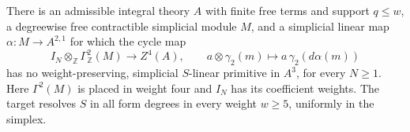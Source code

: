 \begin{proposition}
\label{AL07}
There is an admissible integral theory $A$ with finite free
terms and support $q\leq w$, a degreewise free contractible
simplicial module $M$, and a simplicial linear map
$\alpha:M\to A^{2,1}$ for which the cycle map
\[
 I_N\otimes_{\mathbb Z}\Gamma^2_{\mathbb Z}(M)
       \longrightarrow Z^4(A),\qquad
 a\otimes\gamma_2(m)\longmapsto a\,\gamma_2(d\alpha(m))
 \tag{AL.36}
\]
has no weight-preserving, simplicial $S$-linear primitive
in $A^3$, for every $N\geq1$.
Here $\Gamma^2(M)$ is placed in weight four and
$I_N$ has its coefficient weights.
The target resolves $S$ in all form degrees in every
weight $w\geq5$, uniformly in the simplex.
\end{proposition}

